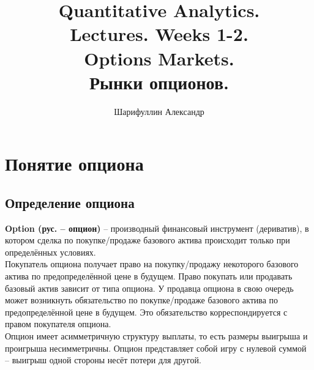 \documentclass{article}
\title{Quantitative Analytics.\\
Lectures. Weeks 1-2. \\
Options Markets.\\
Рынки опционов.}
\author{Шарифуллин Александр}
\begin{document}
\maketitle

\setcounter{tocdepth}{1} %
\renewcommand\contentsname{Содержание}
\tableofcontents
\newpage




\renewcommand{\labelitemi}{\tiny$\bullet$}
\renewcommand{\figurename}{Fig.}

 \section{Понятие опциона}
 \subsection{Определение опциона}
 \textbf{Option (рус. -- опцион)} -- производный финансовый инструмент (дериватив), в котором сделка по покупке/продаже базового актива происходит только при определённых условиях.\\
 Покупатель опциона получает право на покупку/продажу некоторого базового актива по предопределённой цене в будущем. Право покупать или продавать базовый актив зависит от типа опциона. У продавца опциона в свою очередь может возникнуть обязательство по покупке/продаже базового актива по предопределённой цене в будущем. Это обязательство корреспондируется с правом покупателя опциона.\\
 Опцион имеет асимметричную структуру выплаты, то есть размеры выигрыша и проигрыша несимметричны. Опцион представляет собой игру с нулевой суммой -- выигрыш одной стороны несёт потери для другой.
\end{document}
